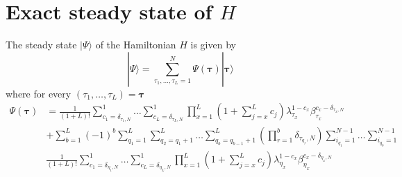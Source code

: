 \documentclass[10pt]{article}
\numberwithin{equation}{section}
\numberwithin{equation}{subsection}
\begin{document}
\section{Exact steady state of $H$}\label{appB}

The steady state $|\Psi\rangle$ of the Hamiltonian $H$ is given by 
\begin{equation}
	|\Psi\rangle=\sum_{\tau_{1},\ldots,\tau_{L}=1}^{N}\Psi(\bm{\tau})|\bm{\tau}\rangle
\end{equation}
where for every $(\tau_{1},\ldots,\tau_{L})=\bm{\tau}$
\begin{equation}
	\begin{split}
		\Psi(\bm{\tau})&=\frac{1}{(1+L)!}\sum_{c_{1}=\delta_{\tau_{1},N}}^{1}\ldots\sum_{c_{L}=\delta_{\tau_{L},N}}^{1}\prod_{x=1}^{L}\left(1+\sum_{j=x}^{L}c_{j}\right)\lambda_{\tau_{x}}^{1-c_{x}}\beta_{\tau_{x}}^{c_{x}-\delta_{\tau_{x},N}}
		\\&+
		\sum_{b=1}^{L}(-1)^{b}\sum_{q_{1}=1}^{L}\sum_{q_{2}=q_{1}+1}^{L}\ldots\sum_{q_{b}=q_{b-1}+1}^{L}\left(\prod_{r=1}^{b}\delta_{\tau_{q_{r}},N}\right) 
		\sum_{i_{q_{1}}=1}^{N-1}\ldots\sum_{i_{q_{b}}=1}^{N-1}
		\\&
	\frac{1}{(1+L)!}\sum_{c_{1}=\delta_{\eta_{1},N}}^{1}\ldots\sum_{c_{L}=\delta_{\eta_{L},N}}^{1}\prod_{x=1}^{L}\left(1+\sum_{j=x}^{L}c_{j}\right)\lambda_{\eta_{x}}^{1-c_{x}}\beta_{\eta_{x}}^{c_{x}-\delta_{\eta_{x},N}}
	\end{split}
\end{equation}
\begin{comment}
\begin{equation}
	\begin{split}
		\Psi(\bm{\tau})&=\sum_{c_{1}=0}^{1-\delta_{\tau_{1},N}}\ldots\sum_{c_{L}=0}^{1-\delta_{\tau_{L},N}}\frac{\Gamma(2+L-\sum_{z=1}^{L}c_{z})}{\Gamma(L+2)}\prod_{y=1}^{L}\left(\lambda_{\tau_{y}}\left(2+L-y-\sum_{j=y}^{L}c_{j}\right)\right)^{c_{y}}\beta_{\tau_{y}}^{(1-c_{y})(1-\delta_{\tau_{y},N})}
		\\&+
		\sum_{b=1}^{L}(-1)^{b}\sum_{q_{1}=1}^{L}\sum_{q_{2}=q_{1}+1}^{L}\ldots\sum_{q_{b}=q_{b-1}+1}^{L}\left(\prod_{r=1}^{b}\delta_{\tau_{q_{r}},N}\right) 
		\sum_{i_{q_{1}}=1}^{N-1}\ldots\sum_{i_{q_{b}}=1}^{N-1}
		\\&
		\sum_{c_{1}=0}^{1-\delta_{\eta_{1}^{b},N}}\ldots\sum_{c_{L}=0}^{1-\delta_{\eta_{L}^{b},N}}\frac{\Gamma(2+L-\sum_{z=1}^{L}c_{z})}{\Gamma(L+2)}\prod_{y=1}^{L}\left(\lambda_{\eta_{y}^{b}}\left(2+L-y-\sum_{j=y}^{L}c_{j}\right)\right)^{c_{y}}\beta_{\eta_{y}^{b}}^{(1-c_{y})(1-\delta_{\eta_{y},N})}
	\end{split}
\end{equation}
\end{comment}
\end{document}
